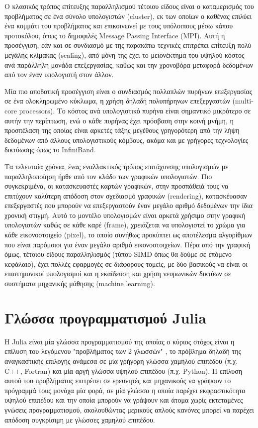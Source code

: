 Ο κλασικός τρόπος επίτευξης παραλληλισμού τέτοιου είδους είναι ο καταμερισμός του προβλήματος σε ένα σύνολο υπολογιστών (cluster), εκ των οποίων ο καθένας επιλύει ένα κομμάτι του προβλήματος και επικοινωνεί με τους υπόλοιπους μέσω κάπου προτοκόλου, όπως το δημοφιλές Message Passing Interface (MPI). Αυτή η προσέγγιση, εάν και σε συνδιασμό με της παρακάτω τεχνικές επιτρέπει επίτευξη πολύ μεγάλης κλίμακας (scaling), από μόνη της έχει το μειονέκτημα του υψηλού κόστος ανά παράλληλη μονάδα επεξεργασίας, καθώς και την χρονοβόρα μεταφορά δεδομένων από τον έναν υπολογιστή στον άλλον.

Μία πιο αποδοτική προσέγγιση είναι ο συνδιασμός πολλαπλών πυρήνων επεξεργασίας σε ένα ολοκληρωμένο κύκλωμα, η χρήση δηλαδή πολυπήρηνων επεξεργαστών (multi-core processors). Το κόστος ανά υπολογιστικό πυρήνα είναι σημαντικό μικρότερο σε αυτήν την περίπτωση, ενώ ο κάθε πυρήνας έχει πρόσβαση στην κοινή μνήμη, η προσπέλαση της οποίας είναι αρκετές τάξης μεγέθους γρηγορότερη από την λήψη δεδομένων από άλλους υπολογιστικούς κόμβους, ακόμα και με γρήγορες τεχνολογίες δικτύωσης όπως το InfiniBand.

Τα τελευταία χρόνια, ένας εναλλακτικός τρόπος επιτάχυνσης υπολογισμών με παραλληλοποίηση ήρθε από τον κλάδο των γραφικών υπολογιστών.
Πιο συγκεκριμένα, οι κατασκευαστές καρτών γραφικών, στην προσπάθειά τους να επιτύχουν καλύτερη απόδοση στον σχεδιασμό γραφικών (rendering), κατασκέυασαν επεξεργαστές που μπορούν να επεξεργαστούν έναν μεγάλο αριθμό δεδομένων την ίδια χρονική στιγμή.
Αυτό το μοντέλο υπολογισμών είναι αρκετά χρήσιμο στην γραφική υπολογιστών καθώς σε κάθε καρέ (frame), χρειάζεται να υπολογιστεί το χρώμα για κάθε εικονοστοιχείο (pixel), το οποίο συνήθως προκύπτει ως αποτέλεσμα αλγορίθμων που είναι παρόμοιοι για έναν μεγάλο αριθμό εικονοστοιχείων.
Πέρα από την γραφική όμως, τέτοιου είδους παραλληλισμός (τύπου SIMD όπως θα δούμε σε επόμενο κεφάλαιο), έχει πολλές εφαρμογές σε διάφορους τομείς, με δύο βασικούς να είναι οι επιστημονικοί υπολογισμοί και η εκαίδευση και χρήση νευρωνικών δικτύων σε συστήματα μηχανικής μάθησης (machine learning).

\section{Γλώσσα προγραμματισμού Julia}

Η Julia είναι μία γλώσσα προγραμματισμού της οποίας ο κύριος στόχος είναι η επίλυση του λεγόμενου "προβλήματος των 2 γλωσσών" \cite[p.~67]{Bezanson2017}, το πρόβλημα δηλαδή της αναγκαστικής επιλογής ανάμεσα σε μία γρήγορη γλώσσα χαμηλού επιπέδου (π.χ. C++, Fortran) και μία αργή γλώσσα υψηλού επιπέδου (π.χ. Python).
Η επίλυση αυτού του προβλήματος επιτρέπει σε ερευνητές και μηχανικούς να γράψουν το πρόγραμμά τους μονάχα μία φορά, σε μία γλώσσα η οποία παρέχει εκφραστικότητα υψηλού επιπέδου και την οποία μπορούν να γράψουν και άτομα χωρίς εκτεταμένες γνώσεις προγραμματισμού, ακολουθώντας μερικούς απλούς κανόνες μπορεί να παρέχει απόδοση συγκρίσιμη με γλώσσες χαμηλού επιπέδου.

